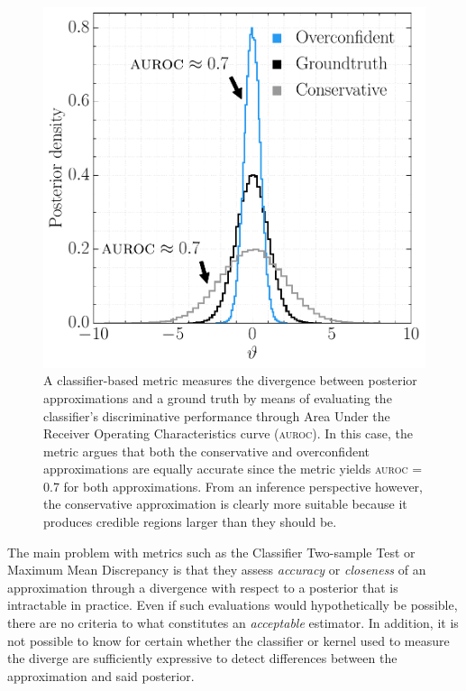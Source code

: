 \documentclass[twoside]{article}
\begin{document}
\begin{figure}[b!]
    \centering
    \includegraphics[width=\linewidth]{figures/auc-deceitful.pdf}
    \caption{A classifier-based metric measures the divergence between posterior approximations and a ground truth by means of evaluating the classifier's discriminative performance through Area Under the Receiver Operating Characteristics curve (\textsc{auroc}). In this case, the metric argues that both the conservative and overconfident approximations are equally accurate since the metric yields \textsc{auroc} = 0.7 for both approximations. From an inference perspective however, the conservative approximation is clearly more suitable because it produces credible regions larger than they should be.}
    \label{fig:auc_deceitful}
\end{figure}
The main problem with metrics such as the Classifier Two-sample Test \citep{lehmann2006testing,lopez2016revisiting} or Maximum Mean Discrepancy \citep{gretton2012kernel,bengio2013bounding,dziugaite2015training} is that they assess \emph{accuracy} or \emph{closeness} of an approximation through a divergence with respect to a posterior that is intractable in practice.
Even if such evaluations would hypothetically be possible,
there are no criteria to what constitutes an \emph{acceptable} estimator.
In addition, it is not possible to know for certain whether the classifier or kernel used to measure the diverge are sufficiently expressive to detect differences between the approximation and said posterior.
\end{document}
